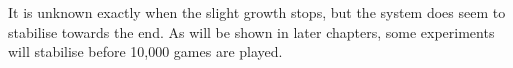 It is unknown exactly when the slight growth stops, but the system does seem to stabilise towards the end. As will be shown in later chapters, some experiments will stabilise before 10,000 games are played.

\begin{figure}[p]
\centering
{}
\\
\\

\end{figure}
